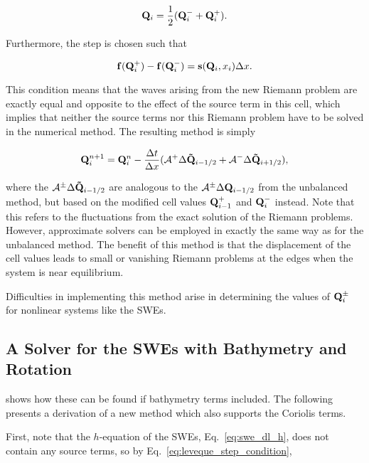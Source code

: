 \begin{equation}
  \label{eq:leveque_avg_condition}
  \vb Q_i = \frac{1}{2}(\vb Q_i^- + \vb Q_i^+).
\end{equation}

Furthermore, the step is chosen such that

\begin{equation}
  \label{eq:leveque_step_condition}
  \vb f(\vb Q_i^+) - \vb f(\vb Q_i^-) = \vb s(\vb Q_i, x_i) \Delta x.
\end{equation}

This condition means that the waves arising from the new Riemann problem are exactly equal and opposite to the effect of the source term in this cell, which implies that neither the source terms nor this Riemann problem have to be solved in the numerical method. The resulting method is simply

\begin{equation}
  \vb Q_i^{n+1} = \vb Q_i^n - \frac{\Delta t}{\Delta x} (\mathcal{A}^+ \Delta \vb{\tilde Q}_{i-1/2} + \mathcal{A}^- \Delta \vb{\tilde Q}_{i+1/2}),
\end{equation}

where the $\mathcal{A}^\pm \Delta \vb{\tilde Q}_{i-1/2}$ are analogous to the $\mathcal{A}^\pm \Delta \vb{Q}_{i-1/2}$ from the unbalanced method, but based on the modified cell values $\vb Q_{i-1}^+$ and $\vb Q_i^-$ instead. Note that this refers to the fluctuations from the exact solution of the Riemann problems. However, approximate solvers can be employed in exactly the same way as for the unbalanced method. The benefit of this method is that the displacement of the cell values leads to small or vanishing Riemann problems at the edges when the system is near equilibrium.

Difficulties in implementing this method arise in determining the values of $\vb Q_i^\pm$ for nonlinear systems like the SWEs.

\subsection{A Solver for the SWEs with Bathymetry and Rotation}
\label{sec:leveque}

\citet{leveque1998balancing} shows how these can be found if bathymetry terms included. The following presents a derivation of a new method which also supports the Coriolis terms.

First, note that the $h$-equation of the SWEs, Eq.~\ref{eq:swe_dl_h}, does not contain any source terms, so by Eq.~\ref{eq:leveque_step_condition},

